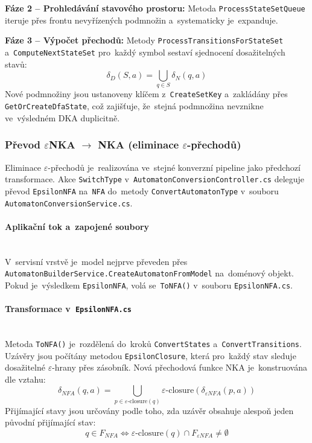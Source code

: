 \documentclass[
  master,
  program=ainfvs,
  printversion,
  figures=false,
  tables=false,
  glossaries,
  index
]{kidiplom}
\begin{document}
\noindent \textbf{Fáze 2 -- Prohledávání stavového prostoru:} Metoda \texttt{Process\-State\-Set\-Queue} iteruje přes frontu nevyřízených podmnožin a~systematicky je~expanduje.

\noindent \textbf{Fáze 3 -- Výpočet přechodů:} Metody \texttt{Process\-Transitions\-For\-State\-Set} a~\texttt{ComputeNextStateSet} pro~každý symbol sestaví sjednocení dosažitelných stavů:
$$\delta_D(S, a) = \bigcup_{q \in S} \delta_N(q, a)$$
Nové podmnožiny jsou ustanoveny klíčem z~\texttt{CreateSetKey} a~zakládány přes \texttt{GetOrCreateDfaState}, což zajišťuje, že~stejná podmnožina nevznikne ve~výsledném \gls{DKA} duplicitně.

\subsubsection{Převod $\varepsilon$NKA $\rightarrow$ NKA (eliminace $\varepsilon$-přechodů)}
Eliminace $\varepsilon$-přechodů je~realizována ve~stejné konverzní pipeline jako předchozí transformace. Akce \texttt{SwitchType} v~\texttt{AutomatonConversionController.cs} deleguje převod \texttt{EpsilonNFA} na~\texttt{NFA} do~metody \texttt{ConvertAutomatonType} v~souboru \texttt{AutomatonConversionService.cs}.

\paragraph{Aplikační tok a~zapojené soubory} \mbox{} \\
V~servisní vrstvě je~model nejprve převeden přes \texttt{Automaton\-Builder\-Servi\-ce\-.\-Cre\-ate\-Automaton\-From\-Model} na~doménový objekt. Pokud je~výsledkem \texttt{EpsilonNFA}, volá se~\texttt{ToNFA()} v~souboru \texttt{EpsilonNFA.cs}.

\paragraph{Transformace v~\texttt{EpsilonNFA.cs}} \mbox{} \\
Metoda \texttt{ToNFA()} je~rozdělená do~kroků \texttt{Convert\-States} a~\texttt{Con\-vert\-Tran\-si\-ti\-ons}. Uzávěry jsou počítány metodou \texttt{EpsilonClosure}, která pro~každý stav sleduje dosažitelné $\varepsilon$-hrany přes zásobník. Nová přechodová funkce \gls{NKA} je~konstruována dle vztahu:
$$\delta_{NFA}(q, a) = \bigcup_{p \in \varepsilon\text{-closure}(q)} \varepsilon\text{-closure}(\delta_{\varepsilon NFA}(p, a))$$
Přijímající stavy jsou určovány podle toho, zda uzávěr obsahuje alespoň jeden původní přijímající stav:
$$q \in F_{NFA} \iff \varepsilon\text{-closure}(q) \cap F_{\varepsilon NFA} \neq \emptyset$$
\end{document}
